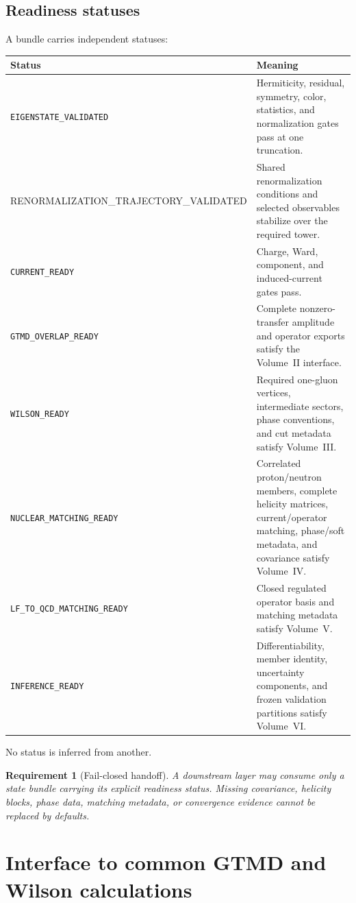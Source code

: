 \documentclass[11pt]{article}
\newtheorem{requirement}[definition]{Requirement}
\begin{document}
\subsection{Readiness statuses}

A bundle carries independent statuses:
\begin{longtable}{L{0.30\textwidth}L{0.60\textwidth}}
\toprule
Status & Meaning\\
\midrule
\endhead
\texttt{EIGENSTATE\_VALIDATED} & Hermiticity, residual, symmetry, color,
statistics, and normalization gates pass at one truncation.\\
{\footnotesize\ttfamily RENORMALIZATION\_\allowbreak TRAJECTORY\_\allowbreak VALIDATED} & Shared renormalization
conditions and selected observables stabilize over the required tower.\\
\texttt{CURRENT\_READY} & Charge, Ward, component, and induced-current gates
pass.\\
\texttt{GTMD\_OVERLAP\_READY} & Complete nonzero-transfer amplitude and
operator exports satisfy the Volume~II interface.\\
\texttt{WILSON\_READY} & Required one-gluon vertices, intermediate sectors,
phase conventions, and cut metadata satisfy Volume~III.\\
\texttt{NUCLEAR\_MATCHING\_READY} & Correlated proton/neutron members,
complete helicity matrices, current/operator matching, phase/soft metadata, and
covariance satisfy Volume~IV.\\
\texttt{LF\_TO\_QCD\_MATCHING\_READY} & Closed regulated operator basis and
matching metadata satisfy Volume~V.\\
\texttt{INFERENCE\_READY} & Differentiability, member identity, uncertainty
components, and frozen validation partitions satisfy Volume~VI.\\
\bottomrule
\end{longtable}
No status is inferred from another.

\begin{requirement}[Fail-closed handoff]
A downstream layer may consume only a state bundle carrying its explicit
readiness status.  Missing covariance, helicity blocks, phase data, matching
metadata, or convergence evidence cannot be replaced by defaults.
\label{req:fail-closed-handoff}
\end{requirement}

\section{Interface to common GTMD and Wilson calculations}
\label{sec:gtmd-interface}
\end{document}
